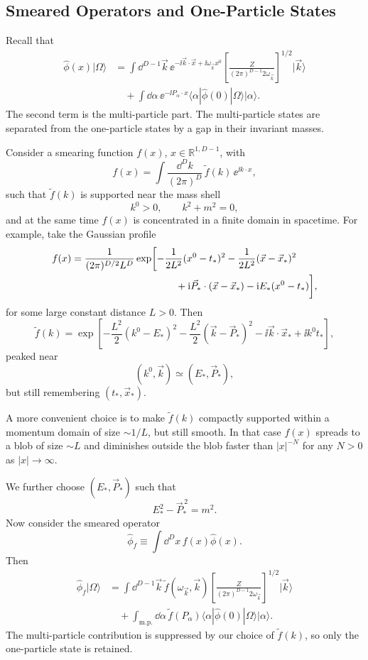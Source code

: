 \subsection{Smeared Operators and One-Particle States}

Recall that
\[
\begin{aligned}
  \hat\phi(x)|\Omega\rangle
  &=
  \int\dd^{D-1}\vec k\,
  \ee^{-\ii\vec k\cdot\vec x+\ii\omega_{\vec k}x^0}
  \left[
    \frac{Z}{(2\pi)^{D-1}2\omega_{\vec k}}
  \right]^{1/2}
  |\vec k\rangle  \\
  &\quad
  +
  \int\dd\alpha\,
  \ee^{-\ii P_\alpha\cdot x}
  \langle\alpha|\hat\phi(0)|\Omega\rangle
  |\alpha\rangle .
\end{aligned}
\]
The second term is the multi-particle part. The multi-particle states are
separated from the one-particle states by a gap in their invariant masses.

Consider a smearing function \(f(x)\), \(x\in\mathbb R^{1,D-1}\), with
\[
  f(x)
  =
  \int\frac{\dd^Dk}{(2\pi)^D}\,\widetilde f(k)\,
  \ee^{\ii k\cdot x},
\]
such that \(\widetilde f(k)\) is supported near the mass shell
\[
  k^0>0,\qquad k^2+m^2=0,
\]
and at the same time \(f(x)\) is concentrated in a finite domain in spacetime.
For example, take the Gaussian profile
\[
\begin{aligned}
  f(x)
  &=
  \frac{1}{(2\pi)^{D/2}L^D}
  \exp\biggl[
    -\frac{1}{2L^2}(x^0-t_*)^2
    -\frac{1}{2L^2}(\vec x-\vec x_*)^2  \\
  &\hspace{3.7cm}
    +\ii\vec P_*\cdot(\vec x-\vec x_*)
    -\ii E_*(x^0-t_*)
  \biggr],
\end{aligned}
\]
for some large constant distance \(L>0\). Then
\[
  \widetilde f(k)
  =
  \exp\left[
    -\frac{L^2}{2}(k^0-E_*)^2
    -\frac{L^2}{2}(\vec k-\vec P_*)^2
    -\ii\vec k\cdot\vec x_*
    +\ii k^0t_*
  \right],
\]
peaked near
\[
  (k^0,\vec k)\simeq(E_*,\vec P_*),
\]
but still remembering \((t_*,\vec x_*)\).

A more convenient choice is to make \(\widetilde f(k)\) compactly supported
within a momentum domain of size \(\sim 1/L\), but still smooth. In that case
\(f(x)\) spreads to a blob of size \(\sim L\) and diminishes outside the blob
faster than \(|x|^{-N}\) for any \(N>0\) as \(|x|\to\infty\).

We further choose \((E_*,\vec P_*)\) such that
\[
  E_*^2-\vec P_*^{\,2}=m^2.
\]
Now consider the smeared operator
\[
  \hat\phi_f
  \equiv
  \int\dd^Dx\, f(x)\hat\phi(x).
\]
Then
\[
\begin{aligned}
  \hat\phi_f|\Omega\rangle
  &=
  \int\dd^{D-1}\vec k\,
  \widetilde f(\omega_{\vec k},\vec k)
  \left[
    \frac{Z}{(2\pi)^{D-1}2\omega_{\vec k}}
  \right]^{1/2}
  |\vec k\rangle \\
  &\quad
  +
  \int_{\mathrm{m.p.}}\dd\alpha\,
  \widetilde f(P_\alpha)
  \langle\alpha|\hat\phi(0)|\Omega\rangle
  |\alpha\rangle .
\end{aligned}
\]
The multi-particle contribution is suppressed by our choice of
\(\widetilde f(k)\), so only the one-particle state is retained.

